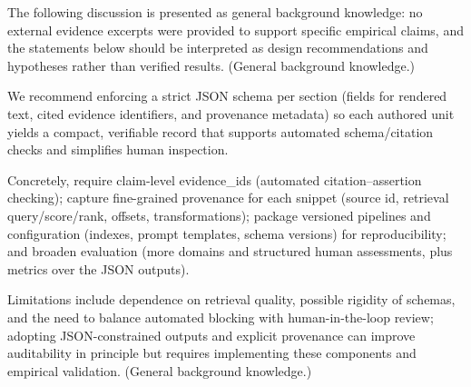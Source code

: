 The following discussion is presented as general background knowledge: no external evidence excerpts were provided to support specific empirical claims, and the statements below should be interpreted as design recommendations and hypotheses rather than verified results. (General background knowledge.)

We recommend enforcing a strict JSON schema per section (fields for rendered text, cited evidence identifiers, and provenance metadata) so each authored unit yields a compact, verifiable record that supports automated schema/citation checks and simplifies human inspection.

Concretely, require claim-level evidence_ids (automated citation–assertion checking); capture fine-grained provenance for each snippet (source id, retrieval query/score/rank, offsets, transformations); package versioned pipelines and configuration (indexes, prompt templates, schema versions) for reproducibility; and broaden evaluation (more domains and structured human assessments, plus metrics over the JSON outputs).

Limitations include dependence on retrieval quality, possible rigidity of schemas, and the need to balance automated blocking with human-in-the-loop review; adopting JSON-constrained outputs and explicit provenance can improve auditability in principle but requires implementing these components and empirical validation. (General background knowledge.)